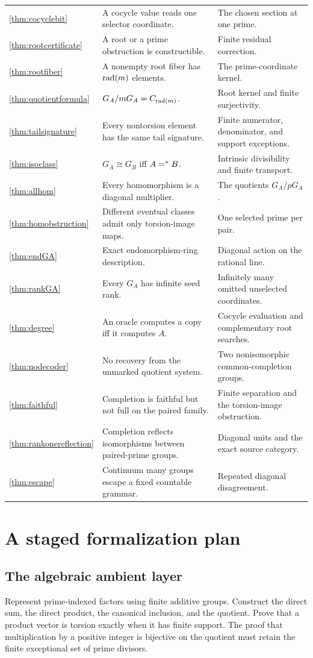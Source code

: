 \begin{longtable}{@{}>{\raggedright\arraybackslash}p{}>{\raggedright\arraybackslash}p{}>{\raggedright\arraybackslash}p{}@{}}
\ref{thm:cocyclebit}&A cocycle value reads one selector coordinate.&The chosen section at one prime.\\
\ref{thm:rootcertificate}&A root or a prime obstruction is constructible.&Finite residual correction.\\
\ref{thm:rootfiber}&A nonempty root fiber has $\operatorname{rad}(m)$ elements.&The prime-coordinate kernel.\\
\ref{thm:quotientformula}&$G_A/mG_A=C_{\operatorname{rad}(m)}$.&Root kernel and finite surjectivity.\\
\ref{thm:tailsignature}&Every nontorsion element has the same tail signature.&Finite numerator, denominator, and support exceptions.\\
\ref{thm:isoclass}&$G_A\cong G_B$ iff $A=^{*} B$.&Intrinsic divisibility and finite transport.\\
\ref{thm:allhom}&Every homomorphism is a diagonal multiplier.&The quotients $G_A/pG_A$.\\
\ref{thm:homobstruction}&Different eventual classes admit only torsion-image maps.&One selected prime per pair.\\
\ref{thm:endGA}&Exact endomorphism-ring description.&Diagonal action on the rational line.\\
\ref{thm:rankGA}&Every $G_A$ has infinite seed rank.&Infinitely many omitted unselected coordinates.\\
\ref{thm:degree}&An oracle computes a copy iff it computes $A$.&Cocycle evaluation and complementary root searches.\\
\ref{thm:nodecoder}&No recovery from the unmarked quotient system.&Two nonisomorphic common-completion groups.\\
\ref{thm:faithful}&Completion is faithful but not full on the paired family.&Finite separation and the torsion-image obstruction.\\
\ref{thm:rankonereflection}&Completion reflects isomorphisms between paired-prime groups.&Diagonal units and the exact source category.\\
\ref{thm:escape}&Continuum many groups escape a fixed countable grammar.&Repeated diagonal disagreement.\\
\bottomrule
\end{longtable}
\normalsize

\section{A staged formalization plan}
\subsection{The algebraic ambient layer}
Represent prime-indexed factors using finite additive groups. Construct the direct sum, the direct product, the canonical inclusion, and the quotient. Prove that a product vector is torsion exactly when it has finite support. The proof that multiplication by a positive integer is bijective on the quotient must retain the finite exceptional set of prime divisors.

